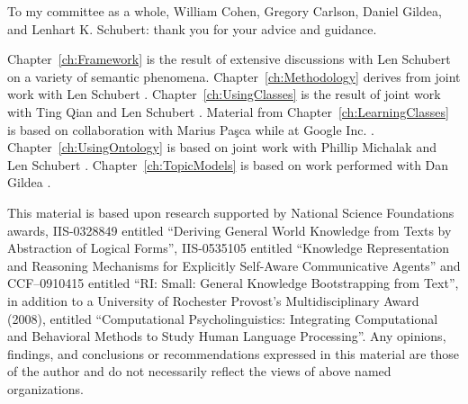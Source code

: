 \documentclass[11pt,leqno]{report}
\begin{document}
\begin{acknowledgments}

  To my committee as a whole, William Cohen, Gregory Carlson, Daniel Gildea, and
  Lenhart K. Schubert: thank you for your advice and guidance.


  Chapter~\ref{ch:Framework} is the result of extensive discussions with Len
  Schubert on a variety of semantic phenomena. Chapter~\ref{ch:Methodology}
  derives from joint work with Len Schubert \cite{vandurmeSTEP08}.
  Chapter~\ref{ch:UsingClasses} is the result of joint work with Ting Qian and
  Len Schubert \cite{vandurmeCOLING08}. Material from
  Chapter~\ref{ch:LearningClasses} is based on collaboration with Marius
  Pa\c{s}ca while at Google Inc. \cite{vandurmeAAAI08}.
  Chapter~\ref{ch:UsingOntology} is based on joint work with Phillip Michalak
  and Len Schubert \cite{vandurmeEACL09}. Chapter~\ref{ch:TopicModels} is based
  on work performed with Dan Gildea \cite{vandurmeTR09}.

  This material is based upon research supported by National Science Foundations
  awards, IIS-0328849 entitled ``Deriving General World Knowledge from Texts by
  Abstraction of Logical Forms'', IIS-0535105 entitled ``Knowledge
  Representation and Reasoning Mechanisms for Explicitly Self-Aware
  Communicative Agents'' and CCF--0910415 entitled ``RI: Small: General
  Knowledge Bootstrapping from Text'', in addition to a University of Rochester
  Provost's Multidisciplinary Award (2008), entitled ``Computational
  Psycholinguistics: Integrating Computational and Behavioral Methods to Study
  Human Language Processing''. Any opinions, findings, and conclusions or
  recommendations expressed in this material are those of the author and do not
  necessarily reflect the views of above named organizations.

\end{acknowledgments}
\end{document}
